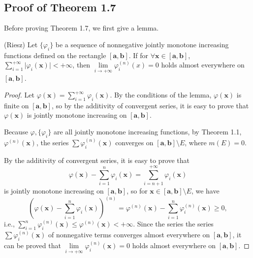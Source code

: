 \documentclass{ijclclp}
\begin{document}
\subsection{Proof of Theorem 1.7}
Before proving Theorem 1.7, we first give a lemma.
\begin{lemma}{(Riesz)}
    Let \(\{\varphi_{i}\}\) be a sequence of nonnegative jointly monotone increasing functions defined on the rectangle \([\boldsymbol{a},\boldsymbol{b}]\). If for \(\forall\boldsymbol{x}\in[\boldsymbol{a},\boldsymbol{b}]\), \(\sum\limits_{i=1}^{+\infty}\lvert\varphi_{i}(\boldsymbol{x})\rvert<+\infty\), then \(\lim\limits_{i\to +\infty}\varphi_{i}^{(n)}(x)=0\) holds almost everywhere on \([\boldsymbol{a},\boldsymbol{b}]\).   
\end{lemma}
\begin{proof}
    Let \(\varphi(\boldsymbol{x})=\sum\limits_{i=1}^{+\infty}\varphi_{i}(\boldsymbol{x})\). By the conditions of the lemma, \(\varphi(\boldsymbol{x})\) is finite on \([\boldsymbol{a},\boldsymbol{b}]\), so by the additivity of convergent series, it is easy to prove that \(\varphi(\boldsymbol{x})\) is jointly monotone increasing on \([\boldsymbol{a},\boldsymbol{b}]\).
    
    Because \(\varphi,\{\varphi_i\}\) are all jointly monotone increasing functions, by Theorem 1.1, \(\varphi^{(n)}(\boldsymbol{x})\), the series \(\sum\varphi_{i}^{(n)}(\boldsymbol{x})\) converges on \([\boldsymbol{a},\boldsymbol{b}]\setminus E\), where \(m(E)=0\). 
   
    By the additivity of convergent series, it is easy to prove that
    \[\varphi(\boldsymbol{x})-\sum_{i=1}^{n}\varphi_{i}(\boldsymbol{x})=\sum_{i=n+1}^{+\infty}\varphi_{i}(\boldsymbol{x})\]
     is jointly monotone increasing on \([\boldsymbol{a},\boldsymbol{b}]\), so for \(\boldsymbol{x}\in[\boldsymbol{a},\boldsymbol{b}]\setminus E\), we have 
    \[\left(\varphi(\boldsymbol{x})-\sum_{i=1}^{n}\varphi_{i}(\boldsymbol{x})\right)^{(n)}=\varphi^{(n)}(\boldsymbol{x})-\sum_{i=1}^{n}\varphi_{i}^{(n)}(\boldsymbol{x})\geq 0,\]
    i.e., \(\sum\limits_{i=1}^{n}\varphi_{i}^{(n)}(\boldsymbol{x})\leq\varphi^{(n)}(\boldsymbol{x})<+\infty\). Since the series the series \(\sum\varphi_{i}^{(n)}(\boldsymbol{x})\)  of nonnegative terms converges almost everywhere on \([\boldsymbol{a},\boldsymbol{b}]\), it can be proved that \(\lim\limits_{i\to+\infty}\varphi_{i}^{(n)}(\boldsymbol{x})=0\) holds almost everywhere on \([\boldsymbol{a},\boldsymbol{b}]\).
\end{proof}
\end{document}
